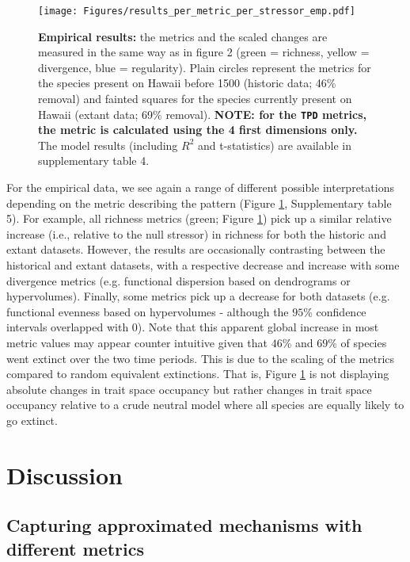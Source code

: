 \documentclass[12pt,letterpaper]{article}
\begin{document}
\begin{figure}[!htbp]
\centering
   \texttt{[image: Figures/results\_per\_metric\_per\_stressor\_emp.pdf]}
\caption{\scriptsize{\textbf{Empirical results:} the metrics and the scaled changes are measured in the same way as in figure 2 (green = richness, yellow = divergence, blue = regularity).
Plain circles represent the metrics for the species present on Hawaii before 1500 (historic data; 46\% removal) and fainted squares for the species currently present on Hawaii (extant data; 69\% removal).
\textbf{NOTE: for the \texttt{TPD} metrics, the metric is calculated using the 4 first dimensions only.}
The model results (including $R^{2}$ and t-statistics) are available in supplementary table 4.
}}
\label{Fig:empirical_results}
\end{figure}
\bigskip

For the empirical data, we see again a range of different possible interpretations depending on the metric describing the pattern (Figure \ref{Fig:empirical_results}, Supplementary table 5).
For example, all richness metrics (green; Figure \ref{Fig:empirical_results}) pick up a similar relative increase (i.e., relative to the null stressor) in richness for both the historic and extant datasets.
However, the results are occasionally contrasting between the historical and extant datasets, with a respective decrease and increase with some divergence metrics (e.g. functional dispersion based on dendrograms or hypervolumes).
Finally, some metrics pick up a decrease for both datasets (e.g. functional evenness based on hypervolumes - although the $95$\% confidence intervals overlapped with $0$).
Note that this apparent global increase in most metric values may appear counter intuitive given that $46$\% and $69$\% of species went extinct over the two time periods.
This is due to the scaling of the metrics compared to random equivalent extinctions.
That is, Figure \ref{Fig:empirical_results} is not displaying absolute changes in trait space occupancy but rather changes in trait space occupancy relative to a crude neutral model where all species are equally likely to go extinct.

\section{Discussion}

\subsection{Capturing approximated mechanisms with different metrics}
\end{document}
